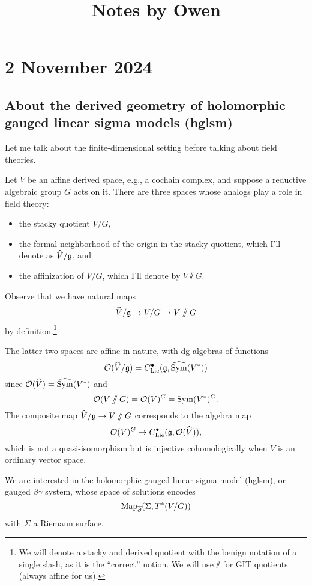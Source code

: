 \documentclass[11pt]{amsart}
\begin{document}
 

\title{Notes by Owen}

\maketitle

\section{2 November 2024}

\subsection{About the derived geometry of holomorphic gauged linear sigma models (hglsm)}

Let me talk about the finite-dimensional setting before talking about field theories.

Let $V$ be an affine derived space, e.g., a cochain complex,
and suppose a reductive algebraic group $G$ acts on it.
There are three spaces whose analogs play a role in field theory:
\begin{itemize}
\item the stacky quotient $V/G$,
\item the formal neighborhood of the origin in the stacky quotient, which I'll denote as $\widehat{V}/\mathfrak g$, and
\item the affinization of $V/G$, which I'll denote by $V \sslash G$.
\end{itemize}
Observe that we have natural maps
\[
\widehat{V}/\mathfrak g \to V/G \to V\mathbin{/\mkern-6mu/} G
\]
by definition.\footnote{We will denote a stacky and derived quotient with the benign notation of a single slash, as it is the ``correct'' notion. We will use $\sslash$ for GIT quotients (always affine for us).}

The latter two spaces are affine in nature, with dg algebras of functions
\[
\mathcal O(\widehat{V}/\mathfrak g) = C^\bullet_{\rm Lie}(\mathfrak g, \widehat{\operatorname{Sym}}(V^*))
\]
since $\mathcal O(\widehat{V}) = \widehat{\operatorname{Sym}}(V^*)$ and
\[
\mathcal O(V\mathbin{/\mkern-6mu/} G) = \mathcal O(V)^G = \operatorname{Sym}(V^*)^G.
\]
The composite map $\widehat{V}/\mathfrak g \to V\mathbin{/\mkern-6mu/} G$ corresponds to the algebra map
\[
\mathcal O(V)^G \to C^\bullet_{\rm Lie}(\mathfrak g, \mathcal O(\widehat{V})),
\]
which is not a quasi-isomorphism but is injective cohomologically when $V$ is an ordinary vector space.

We are interested in the holomorphic gauged linear sigma model (hglsm), or gauged $\beta\gamma$ system, whose space of solutions encodes
\[
{\rm Map}_{\overline{\partial}}(\Sigma, T^*(V/G))
\]
with $\Sigma$ a Riemann surface.
\end{document}

